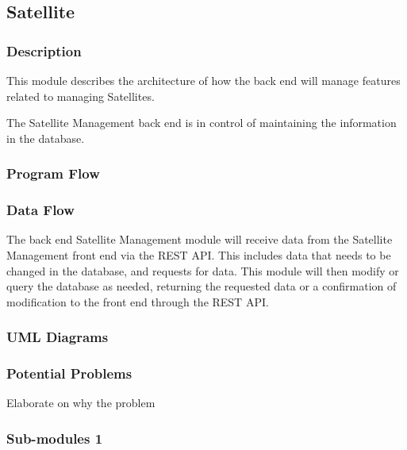 
\subsection{Satellite}

\subsubsection{Description}

This module describes the architecture of how the back end will manage features related to managing Satellites.

The Satellite Management back end is in control of maintaining the information in the database. 


\subsubsection{Program Flow}


\subsubsection{Data Flow}
The back end Satellite Management module will receive data from the Satellite Management front end via the REST API. 
This includes data that needs to be changed in the database, and requests for data. 
This module will then modify or query the database as needed, 
returning the requested data or a confirmation of modification to the front end through the REST API. 


\subsubsection{UML Diagrams}


\subsubsection{Potential Problems}

Elaborate on why the problem

\subsubsection{Sub-modules 1}

